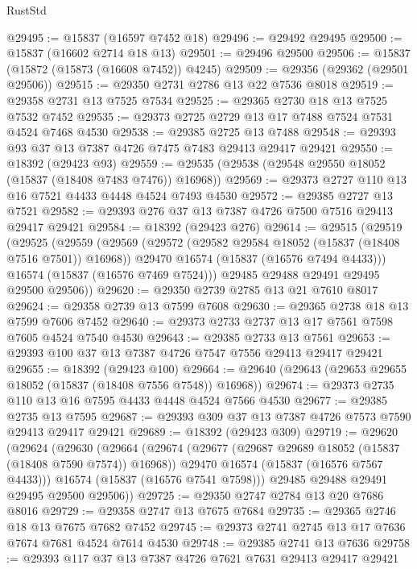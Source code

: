 \begin{lexlean}{RustStd}
\begin{coremodule}
@29495 := @15837 (@16597 @7452 @18)
@29496 := @29492 @29495
@29500 := @15837 (@16602 @2714 @18 @13)
@29501 := @29496 @29500
@29506 := @15837 (@15872 (@15873 (@16608 @7452)) @4245)
@29509 := @29356 (@29362 (@29501 @29506))
@29515 := @29350 @2731 @2786 @13 @22 @7536 @8018
@29519 := @29358 @2731 @13 @7525 @7534
@29525 := @29365 @2730 @18 @13 @7525 @7532 @7452
@29535 := @29373 @2725 @2729 @13 @17 @7488 @7524 @7531 @4524 @7468 @4530
@29538 := @29385 @2725 @13 @7488
@29548 := @29393 @93 @37 @13 @7387 @4726 @7475 @7483 @29413 @29417 @29421
@29550 := @18392 (@29423 @93)
@29559 := @29535 (@29538 (@29548 @29550 @18052 (@15837 (@18408 @7483 @7476)) @16968))
@29569 := @29373 @2727 @110 @13 @16 @7521 @4433 @4448 @4524 @7493 @4530
@29572 := @29385 @2727 @13 @7521
@29582 := @29393 @276 @37 @13 @7387 @4726 @7500 @7516 @29413 @29417 @29421
@29584 := @18392 (@29423 @276)
@29614 := @29515
    (@29519
      (@29525
        (@29559
          (@29569
            (@29572 (@29582 @29584 @18052 (@15837 (@18408 @7516 @7501)) @16968))
            @29470
            @16574
            (@15837 (@16576 @7494 @4433)))
          @16574
          (@15837 (@16576 @7469 @7524)))
        @29485
        @29488
        @29491
        @29495
        @29500
        @29506))
@29620 := @29350 @2739 @2785 @13 @21 @7610 @8017
@29624 := @29358 @2739 @13 @7599 @7608
@29630 := @29365 @2738 @18 @13 @7599 @7606 @7452
@29640 := @29373 @2733 @2737 @13 @17 @7561 @7598 @7605 @4524 @7540 @4530
@29643 := @29385 @2733 @13 @7561
@29653 := @29393 @100 @37 @13 @7387 @4726 @7547 @7556 @29413 @29417 @29421
@29655 := @18392 (@29423 @100)
@29664 := @29640 (@29643 (@29653 @29655 @18052 (@15837 (@18408 @7556 @7548)) @16968))
@29674 := @29373 @2735 @110 @13 @16 @7595 @4433 @4448 @4524 @7566 @4530
@29677 := @29385 @2735 @13 @7595
@29687 := @29393 @309 @37 @13 @7387 @4726 @7573 @7590 @29413 @29417 @29421
@29689 := @18392 (@29423 @309)
@29719 := @29620
    (@29624
      (@29630
        (@29664
          (@29674
            (@29677 (@29687 @29689 @18052 (@15837 (@18408 @7590 @7574)) @16968))
            @29470
            @16574
            (@15837 (@16576 @7567 @4433)))
          @16574
          (@15837 (@16576 @7541 @7598)))
        @29485
        @29488
        @29491
        @29495
        @29500
        @29506))
@29725 := @29350 @2747 @2784 @13 @20 @7686 @8016
@29729 := @29358 @2747 @13 @7675 @7684
@29735 := @29365 @2746 @18 @13 @7675 @7682 @7452
@29745 := @29373 @2741 @2745 @13 @17 @7636 @7674 @7681 @4524 @7614 @4530
@29748 := @29385 @2741 @13 @7636
@29758 := @29393 @117 @37 @13 @7387 @4726 @7621 @7631 @29413 @29417 @29421

\end{coremodule}
\end{lexlean}
